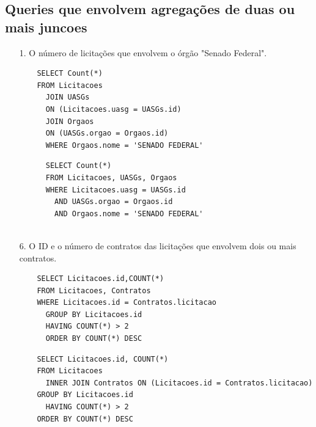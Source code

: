 \documentclass{article}
\begin{document}
\subsection{Queries que envolvem agregações de duas ou mais juncoes}
\begin{itemize}
\item[1.]O número de licitações que envolvem o órgão "Senado Federal".
  \begin{verbatim}
    SELECT Count(*)
    FROM Licitacoes
      JOIN UASGs
      ON (Licitacoes.uasg = UASGs.id)
      JOIN Orgaos
      ON (UASGs.orgao = Orgaos.id)
      WHERE Orgaos.nome = 'SENADO FEDERAL'
  \end{verbatim}
    \begin{verbatim}
      SELECT Count(*)
      FROM Licitacoes, UASGs, Orgaos
      WHERE Licitacoes.uasg = UASGs.id
        AND UASGs.orgao = Orgaos.id
        AND Orgaos.nome = 'SENADO FEDERAL'


  \end{verbatim}

\item[6.]O ID e o número de contratos das licitações que envolvem dois ou mais contratos.
  \begin{verbatim}
    SELECT Licitacoes.id,COUNT(*)
    FROM Licitacoes, Contratos 
    WHERE Licitacoes.id = Contratos.licitacao
      GROUP BY Licitacoes.id
      HAVING COUNT(*) > 2
      ORDER BY COUNT(*) DESC
  \end{verbatim}
    
  \begin{verbatim}
    SELECT Licitacoes.id, COUNT(*)
    FROM Licitacoes
      INNER JOIN Contratos ON (Licitacoes.id = Contratos.licitacao)
    GROUP BY Licitacoes.id
      HAVING COUNT(*) > 2
    ORDER BY COUNT(*) DESC
  \end{verbatim}
  
\end{itemize}
 
\end{document}
